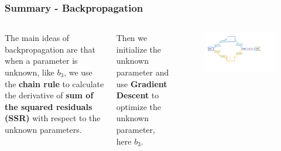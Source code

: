 \documentclass[aspectratio=169]{beamer}
\begin{document}
\begin{frame}[fragile]\frametitle{Summary - Backpropagation}
\begin{columns}

     The main ideas of backpropagation are that when a parameter is unknown, like $b_3$, we use the \textbf{chain rule} to calculate the derivative of \textbf{sum of the squared residuals (SSR)} with respect to the unknown parameters.

     Then we initialize the unknown parameter and use \textbf{Gradient Descent} to optimize the unknown parameter, here $b_3$.
     
    \begin{figure}
    \centering
    \includegraphics[trim={1cm 3cm 5cm 0.35cm },clip,width=0.75\linewidth]{BP_6}
    \end{figure}
    
 

\end{columns}
\end{frame}
\end{document}
